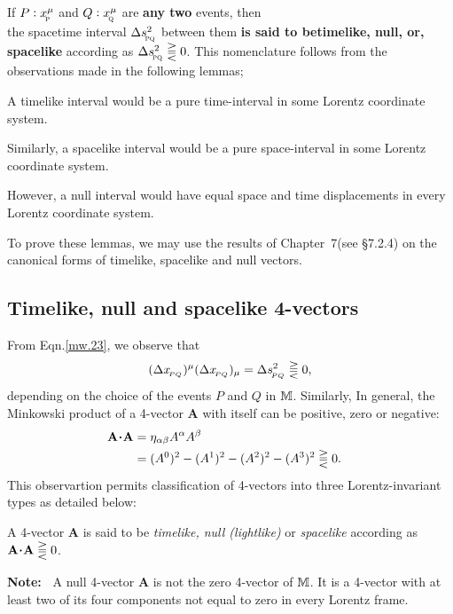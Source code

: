 \dfn If $P : x^{{\mu}}_{_{\hspace*{-1.5pt}\textsc{P} }}$ and $Q:x^{{\mu}}_{_{\hspace*{-1.5pt}\textsc{Q} }}$ 
are \textbf{any two} events, then\\ the spacetime 
interval $\Delta s^2_{_{\hspace*{-1.5pt}\textsc{PQ} }}$ between them 
\textbf{is said to be\lbk  timelike, null, or, 
spacelike} according as $ \Delta s^2_{_{\hspace*{-1.5pt}\textsc{PQ} }} 
\gtreqqless 0 $. This nomenclature follows from the 
observations made in the following lemmas;

\lem A timelike interval would be a pure time-interval in 
some Lorentz coordinate system.

\lem Similarly, a spacelike interval would be a  pure 
space-interval in some Lorentz coordinate system.

\lem However, a null interval would have equal space and 
time displacements in every Lorentz coordinate system.

To prove these lemmas, we may use the results of 
Chapter~7\lbk  (see \S7.2.4) on the canonical forms of 
timelike, spacelike and null vectors.

\subsection{Timelike, null and spacelike  4-vectors} 
  
From Eqn.\eqref{mw.23}, we observe that
\begin{align*}
(\Delta x_{_{\hspace*{-1.5pt}{PQ}}})^{{\mu}}(\Delta
x_{_{\hspace*{-1.5pt}{PQ}}})_{{\mu}}=\Delta s_{_{\hspace*{-1.5pt}{PQ}}}^2
\gtreqqless 0 ,
\end{align*}
depending on the choice of the events $P$ and $Q$ in 
$\mathbb{M}$. Similarly, In general, the Minkowski product of 
a 4-vector $\mathbf{A}$ with itself can be positive, zero 
or negative:
\begin{align}\label{mw.24}
\mathbf{A} \minp \mathbf{A}&=\gky_{\gka\gkb}
A^\gka 
A^\gkb&\notag\\&=(A^0)^2-(A^1)^2-(A^2)^2-(A^3)^2
 \gtreqqless 0.
\end{align}
This observartion permits classification of  4-vectors into 
three Lorentz-invariant types as detailed below:

\dfn A  4-vector $\mathbf{A}$ is said to be 
\textsl{timelike, null (lightlike)} or 
\textsl{spacelike} 
according as $ \mathbf{A} \minp 
\mathbf{A}\gtreqqless 0$.

\textbf{Note:~} A null 4-vector $\mathbf{A}$ is not 
the zero 4-vector of $\mathbb{M}$. It is a 4-vector 
with at least two of its four components not equal to zero 
in every Lorentz frame.

